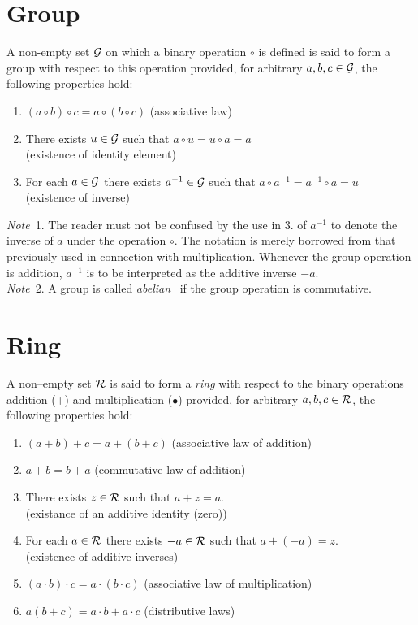 \documentclass[a4paper]{article}
\theoremstyle{plain} %
{\theorembodyfont{\normalfont}
\newtheorem{Exa}{Example}}
\begin{document}
\appendix

\section{Group}
A non-empty set $\cal G$ on which a binary operation $\circ$ is
defined is said to form a group with respect to this operation
provided, for arbitrary $a,b,c \in \cal G$, the following
properties hold: \cite[p.82]{algebra1}
\begin{enumerate}
 \item $(a \circ b) \circ c = a \circ (b \circ c)$ \hfill
 (associative law)
 \item There exists $u \in \cal G$ such that $a \circ u = u \circ
 a = a$ \\ \mbox{} \hfill (existence of identity element)
 \item For each $a \in \cal G$ there exists $a^{-1} \in \cal G$
 such that $a \circ a^{-1} = a^{-1} \circ a = u$ \\
 \mbox{} \hfill (existence of inverse)
\end{enumerate}

{\em Note}~1. The reader must not be confused by the use in 3. of
$a^{-1}$ to denote the inverse of $a$ under the operation $\circ$.
The notation is merely borrowed from that previously used in
connection with multiplication. Whenever the group operation is
addition, $a^{-1}$ is to be interpreted as the additive inverse
$-a$.\\

{\em Note}~2. A group is called {\em abelian}~ if the group
operation is commutative.

\section{Ring}
A non--empty set $\cal R$ is said to form a {\em ring} with
respect to the binary operations addition (+) and multiplication
($\bullet$) provided, for arbitrary $a,b,c \in \cal R$, the
following properties hold:  \cite[p.101]{algebra1}
\begin{enumerate}
  \item $(a+b)+c = a+(b+c)$ \hfill (associative law of addition)
  \item $a+b = b+a$ \hfill (commutative law of addition)
  \item There exists $z \in \cal R$ such that $a+z=a$.\\ \mbox{} \hfill
  (existance of an additive identity (zero))
  \item For each $a \in \cal R$ there exists $-a \in \cal R$ such
  that $a+(-a)=z$.\\ \mbox{} \hfill (existence of additive inverses)
  \item $(a \cdot b)\cdot c = a \cdot (b \cdot c)$ \hfill
  (associative law of multiplication)
  \item $a(b+c) = a \cdot b + a \cdot c$ \hfill (distributive
  laws)
\end{enumerate}
\end{document}
